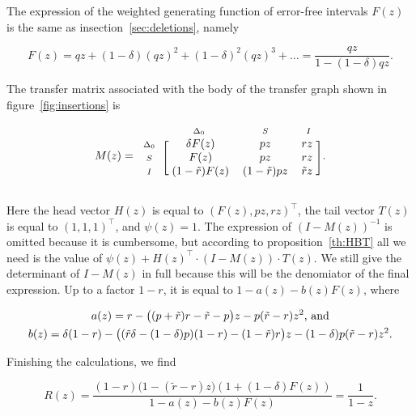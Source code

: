 \documentclass{article}
\newcommand{\smI}{\scriptstyle{I}}
\newcommand{\smS}{\scriptstyle{S}}
\newcommand{\smDELz}{\scriptstyle{\Delta_0}}
\begin{document}
The expression of the weighted generating function of error-free intervals
$F(z)$ is the same as insection~\ref{sec:deletions}, namely

\begin{equation*}
F(z) = qz + (1-\delta)(qz)^2 + (1-\delta)^2(qz)^3 + \ldots =
\frac{qz}{1-(1-\delta)qz}.
\end{equation*}

The transfer matrix associated with the body of the transfer graph shown
in figure~\ref{fig:insertions} is

\begin{equation*}
M(z) = 
\begin{blockarray}{cccc}
       & \smDELz & \smS & \smI \\
\begin{block}{c[ccc]}
\smDELz & \; \delta F(z) & pz & rz \; \\
\smS    & \;        F(z) & pz & rz \; \\
\smI    & \; (1-\tilde{r})F(z)
           & (1-\tilde{r})pz & \tilde{r}z \; \\
\end{block}
\end{blockarray}.
\end{equation*}

Here the head vector $H(z)$ is equal to $(F(z), pz, rz)^\top$, the tail
vector $T(z)$ is equal to $(1,1,1)^\top$, and $\psi(z) = 1$. The
expression of $(I-M(z))^{-1}$ is omitted because it is cumbersome, but
according to proposition~\ref{th:HBT} all we need is the value of
$\psi(z)+H(z)^\top \cdot (I-M(z)) \cdot T(z)$. We still give the
determinant of $I-M(z)$ in full because this will be the denomiator of the
final expression. Up to a factor $1-r$, it is equal to $1-a(z)-b(z)F(z)$,
where

\begin{gather}
\label{eq:a+b}
a(z) = r-\big((p+\tilde{r})r-\tilde{r}-p\big)z
- p(\tilde{r}-r)z^2\text{, and} \\
b(z) = \delta(1-r) - \big((\tilde{r}\delta-(1-\delta)p)(1-r)
-(1-\tilde{r})r\big)z -(1-\delta)p(\tilde{r}-r)z^2.
\notag
\end{gather}

Finishing the calculations, we find

\begin{equation}
\label{eq:Rindel}
R(z) = \frac{(1-r)\big( 1-(\tilde{r}-r)z \big)
\left(1+(1-\delta)F(z) \right)}{1-a(z)-b(z)F(z)}
= \frac{1}{1-z}.
\end{equation}
\end{document}
